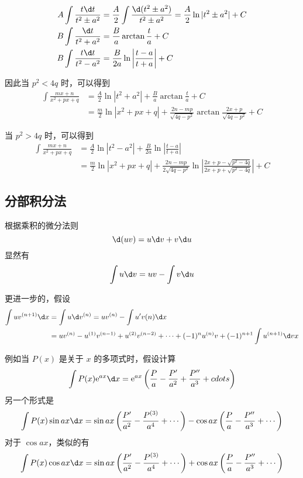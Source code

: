 \[
	\begin{aligned}
		A\int \frac{t \d t}{t^2 \pm a^2} & = \frac{A}{2}\int \frac{\d(t^2 \pm a^2)}{t^2 \pm a^2} = \frac{A}{2} \ln|t^2 \pm a^2| +C \\
		B\int \frac{\d t}{t^2 + a^2}     & = \frac{B}{a}\arctan\frac{t}{a}+C                                                       \\
		B\int \frac{t \d t}{t^2 - a^2}   & = \frac{B}{2a}\ln\left|\frac{t-a}{t+a}\right|+C
	\end{aligned}
\]

因此当 $p^2<4q$ 时，可以得到
\[
	\begin{aligned}
		\int \frac{mx+n}{x^2+px+q} & = \frac{A}{2} \ln|t^2 + a^2| + \frac{B}{a}\arctan\frac{t}{a} + C                               \\
		                           & =\frac{m}{2}\ln|x^2+px+q| + \frac{2n-mp}{\sqrt{4q-p^2}}\arctan{\frac{2x+p}{\sqrt{4q-p^2}}} + C
	\end{aligned}
\]

当 $p^2>4q$ 时，可以得到
\[
	\begin{aligned}
		\int \frac{mx+n}{x^2+px+q} & = \frac{A}{2} \ln|t^2 - a^2| + \frac{B}{2a}\ln\left|\frac{t-a}{t+a}\right|                                                  \\
		                           & =\frac{m}{2}\ln|x^2+px+q| + \frac{2n-mp}{2\sqrt{4q-p^2}}\ln\left| \frac{2x+p-\sqrt{p^2-4q}}{2x+p+\sqrt{p^2-4q}} \right| + C
	\end{aligned}
\]

\subsection{分部积分法}

根据乘积的微分法则
\[ \d(uv) = u \d v + v \d u \]
显然有
\[ \int u \d v = uv - \int v \d u \]

更进一步的，假设
\[ \begin{aligned}
		\int u v^{(n+1)} \d x & = \int u \d v^{(n)} = uv^{(n)} - \int u' v(n) \d x                                                                 \\
		                      & = u v^{(n)} - u^{(1)} v^{(n-1)} + u^{(2)} v^{(n-2)} + \cdots + (-1)^n u^{(n)} v + (-1)^{n+1} \int u^{(n+1)} \d v x
	\end{aligned} \]

例如当 $P(x)$ 是关于 $x$ 的多项式时，假设计算
\[ \int P(x) \ee^{ax} \d x = \ee^{ax} \left( \frac{P}{a} - \frac{P'}{a^2} + \frac{P''}{a^3} + cdots \right) \]
另一个形式是
\[ \int P(x) \sin ax \d x = \sin ax \left( \frac{P'}{a^2} - \frac{P^{(3)}}{a^4} + \cdots  \right) - \cos ax \left( \frac{P}{a} - \frac{P''}{a^3} + \cdots \right) \]
对于 $\cos ax$，类似的有
\[ \int P(x) \cos ax \d x = \sin ax \left( \frac{P'}{a^2} - \frac{P^{(3)}}{a^4} + \cdots  \right) + \cos ax \left( \frac{P}{a} - \frac{P''}{a^3} + \cdots \right) \]

